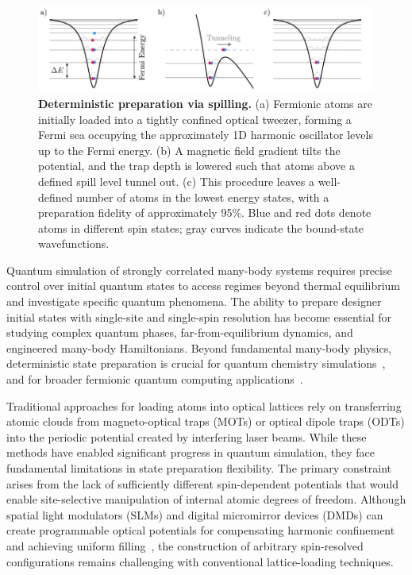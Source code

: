 

\begin{figure}
    \centering
    \includegraphics{fig-ai/preparation.pdf}
    \caption{
        \textbf{Deterministic preparation via spilling.}
        (a) Fermionic atoms are initially loaded into a tightly confined optical tweezer, forming a Fermi sea occupying the approximately 1D harmonic oscillator levels up to the Fermi energy. 
        (b) A magnetic field gradient tilts the potential, and the trap depth is lowered such that atoms above a defined spill level tunnel out. 
        (c) This procedure leaves a well-defined number of atoms in the lowest energy states, with a preparation fidelity of approximately 95\%. 
        Blue and red dots denote atoms in different spin states; gray curves indicate the bound-state wavefunctions.
    }
    \label{fig:preparation}
\end{figure}


Quantum simulation of strongly correlated many-body systems requires precise control over initial quantum states to access regimes beyond thermal equilibrium and investigate specific quantum phenomena. The ability to prepare designer initial states with single-site and single-spin resolution has become essential for studying complex quantum phases, far-from-equilibrium dynamics, and engineered many-body Hamiltonians. Beyond fundamental many-body physics, deterministic state preparation is crucial for quantum chemistry simulations~\cite{gkritsis_simulating_2025}, and for broader fermionic quantum computing applications~\cite{gonzalez-cuadra_fermionic_2023}.

Traditional approaches for loading atoms into optical lattices rely on transferring atomic clouds from magneto-optical traps (MOTs) or optical dipole traps (ODTs) into the periodic potential created by interfering laser beams. While these methods have enabled significant progress in quantum simulation, they face fundamental limitations in state preparation flexibility. The primary constraint arises from the lack of sufficiently different spin-dependent potentials that would enable site-selective manipulation of internal atomic degrees of freedom. Although spatial light modulators (SLMs) and digital micromirror devices (DMDs) can create programmable optical potentials for compensating harmonic confinement and achieving uniform filling~\cite{mazurenko_cold-atom_2017}, the construction of arbitrary spin-resolved configurations remains challenging with conventional lattice-loading techniques.

